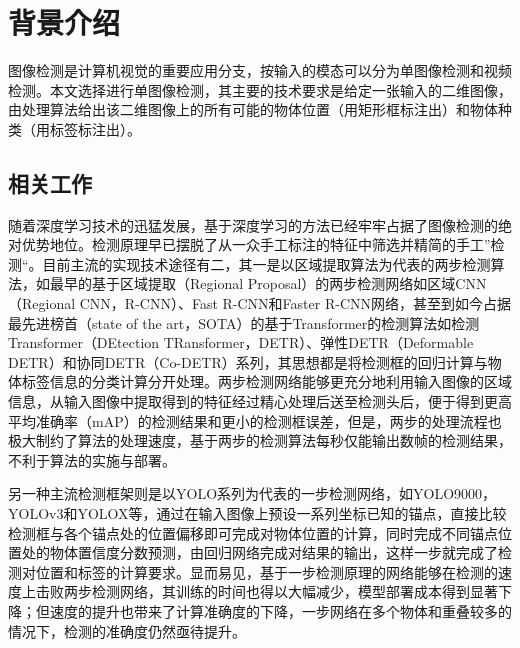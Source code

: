 \documentclass[11pt]{article}
\begin{document}
\newpage

\setcounter{tocdepth}{3}
\tableofcontents
\newpage

\setcounter{page}{1}

\section{背景介绍}
图像检测是计算机视觉的重要应用分支，按输入的模态可以分为单图像检测和视频检测。本文选择进行单图像检测，其主要的技术要求是给定一张输入的二维图像，由处理算法给出该二维图像上的所有可能的物体位置（用矩形框标注出）和物体种类（用标签标注出）。
\subsection{相关工作}
随着深度学习技术的迅猛发展，基于深度学习的方法已经牢牢占据了图像检测的绝对优势地位。检测原理早已摆脱了从一众手工标注的特征中筛选并精简的手工”检测“\cite{wangRegionletsGenericObject2013}。目前主流的实现技术途径有二，其一是以区域提取算法为代表的两步检测算法，如最早的基于区域提取（Regional Proposal）的两步检测网络如区域CNN\cite{girshickRichFeatureHierarchies2014}（Regional CNN，R-CNN）、Fast R-CNN\cite{girshickFastRCNN}和Faster R-CNN网络\cite{renFasterRCNNRealTime2016}，甚至到如今占据最先进榜首（state of the art，SOTA）的基于Transformer的检测算法如检测Transformer\cite{carionEndtoEndObjectDetection2020}（DEtection TRansformer，DETR）、弹性DETR（Deformable DETR）和协同DETR（Co-DETR）系列，其思想都是将检测框的回归计算与物体标签信息的分类计算分开处理。两步检测网络能够更充分地利用输入图像的区域信息，从输入图像中提取得到的特征经过精心处理后送至检测头后，便于得到更高平均准确率（mAP）的检测结果和更小的检测框误差，但是，两步的处理流程也极大制约了算法的处理速度，基于两步的检测算法每秒仅能输出数帧的检测结果，不利于算法的实施与部署。

另一种主流检测框架则是以YOLO\cite{redmonYouOnlyLook2016}系列为代表的一步检测网络，如YOLO9000\cite{redmonYOLO9000BetterFaster2017}，YOLOv3\cite{redmonYOLOv3IncrementalImprovement2018}和YOLOX\cite{geYOLOXExceedingYOLO2021}等，通过在输入图像上预设一系列坐标已知的锚点，直接比较检测框与各个锚点处的位置偏移即可完成对物体位置的计算，同时完成不同锚点位置处的物体置信度分数预测，由回归网络完成对结果的输出，这样一步就完成了检测对位置和标签的计算要求。显而易见，基于一步检测原理的网络能够在检测的速度上击败两步检测网络，其训练的时间也得以大幅减少，模型部署成本得到显著下降；但速度的提升也带来了计算准确度的下降，一步网络在多个物体和重叠较多的情况下，检测的准确度仍然亟待提升。
\end{document}
